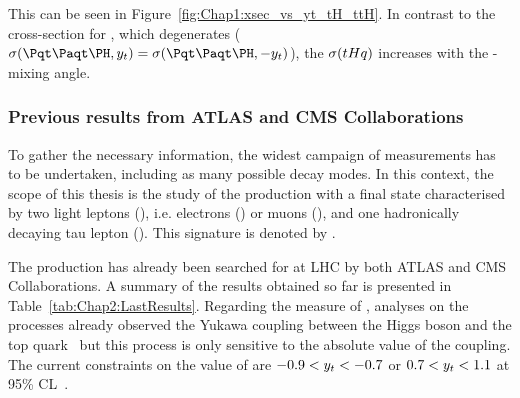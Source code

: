This can be seen in Figure~\ref{fig:Chap1:xsec_vs_yt_tH_ttH}. 
In contrast to the cross-section for \ttH, which degenerates ($\sigma(\ttH, \yt) = \sigma(\ttH, -\yt)$),
the $\sigma(tHq)$ increases with the \CP-mixing angle.




\subsubsection{Previous results from ATLAS and CMS Collaborations}


To gather the necessary information, the widest campaign of measurements has to 
be undertaken, including as many possible decay modes. 
In this context, the scope of this thesis is the study of the production \tHq with a final state 
characterised by two light leptons (\Plepton), i.e. electrons (\Pepm) or muons (\Pmupm), and one
hadronically decaying tau lepton (\tauhad). This signature is denoted by \dileptau.

The \tH production has already been searched for at LHC by both ATLAS and CMS Collaborations.
A summary of the results obtained so far is presented in Table~\ref{tab:Chap2:LastResults}.
Regarding the measure of \yt, analyses on the \ttH processes already observed the  
Yukawa coupling between the Higgs boson and the top quark~\cite{ATLAS:2018mme}
but this process is only sensitive to the absolute value of the coupling. The current
constraints on the value of \yt are  $-0.9<y_{t} <-0.7$ or $0.7<y_{t} <1.1$ at 95\% CL~\cite{CMS:2020mpn}.

